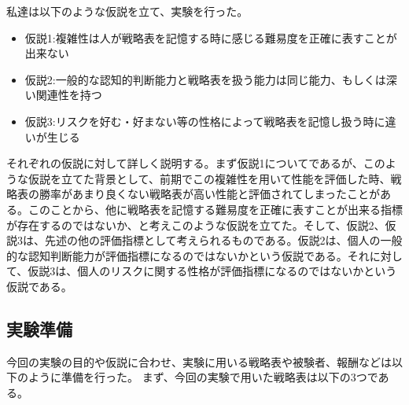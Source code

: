 私達は以下のような仮説を立て、実験を行った。
\begin{itemize}
    \item 仮説1:複雑性は人が戦略表を記憶する時に感じる難易度を正確に表すことが出来ない
    \item 仮説2:一般的な認知的判断能力と戦略表を扱う能力は同じ能力、もしくは深い関連性を持つ
    \item 仮説3:リスクを好む・好まない等の性格によって戦略表を記憶し扱う時に違いが生じる
\end{itemize}
それぞれの仮説に対して詳しく説明する。まず仮説1についてであるが、このような仮説を立てた背景として、前期でこの複雑性を用いて性能を評価した時、戦略表の勝率があまり良くない戦略表が高い性能と評価されてしまったことがある。このことから、他に戦略表を記憶する難易度を正確に表すことが出来る指標が存在するのではないか、と考えこのような仮説を立てた。そして、仮説2、仮説3は、先述の他の評価指標として考えられるものである。仮説2は、個人の一般的な認知判断能力が評価指標になるのではないかという仮説である。それに対して、仮説3は、個人のリスクに関する性格が評価指標になるのではないかという仮説である。

\subsection{実験準備}

今回の実験の目的や仮説に合わせ、実験に用いる戦略表や被験者、報酬などは以下のように準備を行った。
まず、今回の実験で用いた戦略表は以下の3つである。

